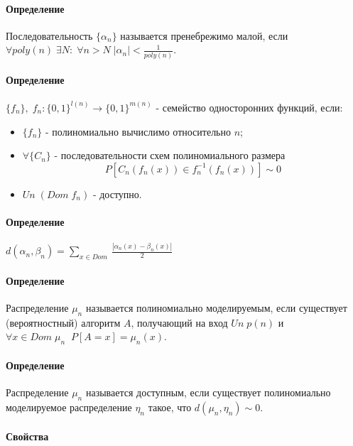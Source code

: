 \documentclass[12pt, a4paper]{article}
\newcommand{\dom}{Dom \;}
\newcommand{\uniform}{Un \;}
\begin{document}
\paragraph{Определение} Последовательность $\{\alpha_n\}$ называется пренебрежимо малой, если $\forall poly(n) \; \exists N : \; \forall n > N \; |\alpha_n| < \frac{1}{poly(n)}$.

\paragraph{Определение} $\{f_n\}, \; f_n : \{0, 1\}^{l(n)} \rightarrow \{0, 1\}^{m(n)}$ - семейство односторонних функций, если:

\begin{itemize}
 \item $\{f_n\}$ - полиномиально вычислимо относительно $n$;
 \item $\forall \{C_n\}$ - последовательности схем полиномиального размера
 \[
  P[C_n(f_n(x)) \in f_n^{-1}(f_n(x))] \sim 0
 \]
 \item  $\uniform(\dom f_n)$ - доступно.

\end{itemize}

\paragraph{Определение} $d(\alpha_n, \beta_n) = \sum\limits_{x \in \dom} \frac{|\alpha_n(x) - \beta_n(x)|}{2}$

\paragraph{Определение} Распределение $\mu_n$ называется полиномиально моделируемым, если существует (вероятностный) алгоритм $A$, получающий на вход $\uniform p(n)$ и $\forall x \in \dom \mu_n \; \; P[A = x] = \mu_n(x)$.

\paragraph{Определение} Распределение $\mu_n$ называется доступным, если существует полиномиально моделируемое распределение $\eta_n$ такое, что $d(\mu_n, \eta_n) \sim 0$.

\paragraph{Свойства}
\end{document}
